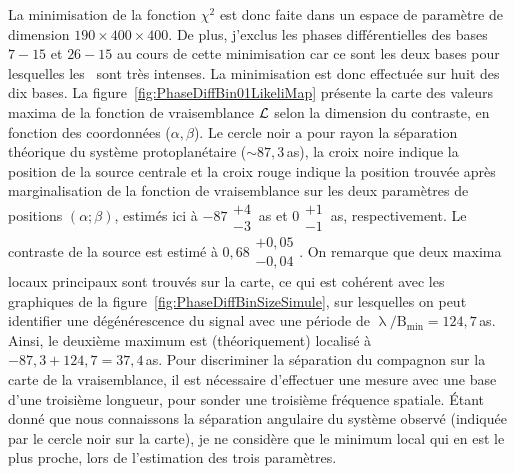 La minimisation de la fonction $\chi^2$ est donc faite dans un espace de paramètre de dimension $190 \times 400 \times 400$. De plus, j'exclus les phases différentielles des bases $7-15$ et $26-15$ au cours de cette minimisation car ce sont les deux bases pour lesquelles les \wiggles~sont très intenses. La minimisation est donc effectuée sur huit des dix bases. La figure~\ref{fig:PhaseDiffBin01LikeliMap} présente la carte des valeurs maxima de la fonction de vraisemblance $\mathcal{L}$ selon la dimension du contraste, en fonction des coordonnées ($\alpha, \beta$). Le cercle noir a pour rayon la séparation théorique du système protoplanétaire ($\sim 87,3\,$as), la croix noire indique la position de la source centrale et la croix rouge indique la position trouvée après marginalisation de la fonction de vraisemblance sur les deux paramètres de positions $(\alpha; \beta)$, estimés ici à $-87\substack{+4 \\ -3} \,$as et $0\substack{+1 \\ -1} \,$as, respectivement. Le contraste de la source est estimé à $0,68\substack{+0,05 \\ -0,04}$. On remarque que deux maxima locaux principaux sont trouvés sur la carte, ce qui est cohérent avec les graphiques de la figure~\ref{fig:PhaseDiffBinSizeSimule}, sur lesquelles on peut identifier une dégénérescence du signal avec une période de $\uplambda / \text{B}_{\text{min}} = 124,7 \,$as. Ainsi, le deuxième maximum est (théoriquement) localisé à $-87,3 + 124,7 = 37,4 \,$as. Pour discriminer la séparation du compagnon sur la carte de la vraisemblance, il est nécessaire d'effectuer une mesure avec une base d'une troisième longueur, pour sonder une troisième fréquence spatiale. Étant donné que nous connaissons la séparation angulaire du système observé (indiquée par le cercle noir sur la carte), je ne considère que le minimum local qui en est le plus proche, lors de l'estimation des trois paramètres.


